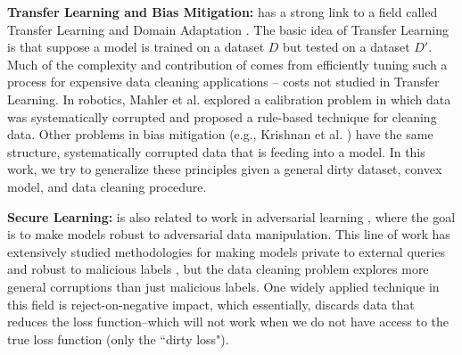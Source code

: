 \vspace{0.5em}

\noindent \textbf{Transfer Learning and Bias Mitigation: }  
\sys has a strong link to a field called Transfer Learning and Domain Adaptation \cite{pan2010survey}. The basic idea of Transfer Learning is that suppose a model is trained on a dataset $D$ but tested on a dataset $D'$. 
Much of the complexity and contribution of \sys comes from efficiently tuning such a process for expensive data cleaning applications -- costs not studied in Transfer Learning.
In robotics, Mahler et al. explored a calibration problem in which data was systematically corrupted \cite{DBLP:conf/case/MahlerKLSMKPWFAG14} and proposed a rule-based technique for cleaning data.
Other problems in bias mitigation (e.g., Krishnan et al. \cite{DBLP:conf/recsys/KrishnanPFG14}) have the same structure, systematically corrupted data that is feeding into a model.
In this work, we try to generalize these principles given a general dirty dataset, convex model, and data cleaning procedure.


\vspace{0.5em}

\noindent \textbf{Secure Learning: } \sys is also related to work in adversarial learning \cite{nelson2012query}, where the goal is to make models robust to adversarial data manipulation.
This line of work has extensively studied methodologies for making models private to external queries and robust to malicious labels \cite{xiaofeature}, but the data cleaning problem explores more general corruptions than just malicious labels.
One widely applied technique in this field is reject-on-negative impact, which essentially, discards data that reduces the loss function--which will not work when we do not have access to the true loss function (only the ``dirty loss"). 


